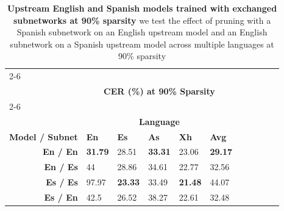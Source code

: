 \begin{table}
\centering
\begin{tabular}{lllllllllll}
& \\ \cline{2-6} \\[-2.3ex] 
& \multicolumn{5}{c}{\textbf{CER (\%) at 90\% Sparsity}} \\[0.75ex] \cline{2-6} \\[-2.35ex]
& \multicolumn{5}{c}{\textbf{Language}} \\[0.5ex] \hline
\multicolumn{1}{l|}{\textbf{Model / Subnet}} & \multicolumn{1}{l}{\textbf{En}} & \multicolumn{1}{l}{\textbf{Es}} & \multicolumn{1}{l}{\textbf{As}} & \multicolumn{1}{l}{\textbf{Xh}} & \multicolumn{1}{l}{\textbf{Avg}} \\ \hline
\multicolumn{1}{r|}{\textbf{En / En}} & \multicolumn{1}{|l}{\textbf{31.79}} & \multicolumn{1}{l}{28.51} & \multicolumn{1}{l}{\textbf{33.31}} & \multicolumn{1}{l}{{23.06}} & \textbf{29.17} \\ %
\multicolumn{1}{r|}{\textbf{En / Es}} & \multicolumn{1}{|l}{44} & \multicolumn{1}{l}{28.86} & \multicolumn{1}{l}{34.61} & \multicolumn{1}{l}{{22.77}} & 32.56 \\ %
\multicolumn{1}{r|}{\textbf{Es / Es}} & \multicolumn{1}{|l}{{97.97}} & \multicolumn{1}{l}{\textbf{23.33}} & \multicolumn{1}{l}{33.49} & \multicolumn{1}{l}{\textbf{21.48}} & 44.07 \\ %
\multicolumn{1}{r|}{\textbf{Es / En}} & \multicolumn{1}{|l}{42.5} & \multicolumn{1}{l}{{26.52}} & \multicolumn{1}{l}{38.27} & \multicolumn{1}{l}{22.61} & 32.48 \\ \hline
\end{tabular}
\caption{\textbf{Upstream English and Spanish models trained with exchanged subnetworks at 90\% sparsity} we test the effect of pruning with a Spanish subnetwork on an English upstream model and an English subnetwork on a Spanish upstream model across multiple languages at 90\% sparsity }%
\label{pru_tab:90perc_English_Mask_Results}
\end{table}

